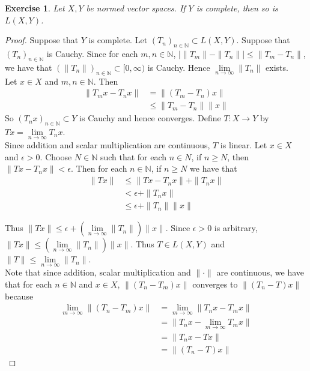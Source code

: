 \documentclass[12pt]{amsart}
\newtheorem{ex}[thm]{Exercise}
\newcommand{\ep}{\epsilon}
\newcommand{\N}{\mathbb{N}}
\newcommand{\Rg}{[0,\infty)}
\newcommand{\limn}{\lim \limits_{n \rightarrow \infty}}
\begin{document}
	\begin{ex}
		Let $X,Y$ be normed vector spaces. If $Y$ is complete, then so is $L(X,Y)$.
	\end{ex}
	
	\begin{proof}
		Suppose that $Y$ is complete. Let $(T_n)_{n \in \N} \subset L(X,Y)$. Suppose that $(T_n)_{n \in \N}$ is Cauchy. Since for each $m,n \in \N$, $\big\vert \|T_m \|- \|T_n \|\big\vert \leq \|T_m -T_n \|$, we have that $(\|T_n \|)_{n \in \N} \subset \Rg$ is Cauchy. Hence $\lim\limits_{n \rightarrow \infty}\|T_n \|$ exists. \vspace{1cm} \\ Let $x \in X$ and $m,n \in \N$. Then 
		\begin{align*}
			\|T_m x - T_n x \|
			&= \|(T_m-T_n) x \|\\
			&\leq \|T_m-T_n \|\|x \|
		\end{align*}
		So $(T_nx)_{n \in \N} \subset Y$ is Cauchy and hence converges. Define $T:X \rightarrow Y$ by $Tx = \lim\limits_{n \rightarrow \infty} T_nx$. \vspace{1cm}\\
		Since addition and scalar multiplication are continuous, $T$ is linear. Let $x \in X$ and $\ep>0$. Choose $N \in \N$ such that for each $n \in N$, if $n \geq N$, then $\|Tx - T_n x\|< \ep$. Then for each $n \in \N$, if $n \geq N$ we have that 
		\begin{align*}
			\|Tx\|
			&\leq \|Tx-T_nx \|+ \|T_nx \|\\
			&< \ep + \|T_nx \|\\
			&\leq \ep + \|T_n \|\|x \|
		\end{align*}  
		
		Thus $\|Tx \|\leq \ep +(\lim\limits_{n \rightarrow \infty} \|T_n \|) \|x \|$. Since $\ep >0$ is arbitrary, $\|Tx \|\leq (\lim\limits_{n \rightarrow \infty} \|T_n \|) \|x \|$. Thus $T \in L(X,Y)$ and $\|T \|\leq \limn \|T_n \|$. \vspace{1cm} \\
		Note that since addition, scalar multiplication and $\|\cdot \|$ are continuous, we have that for each $n \in \N$ and $x \in X$, $\|(T_n-T_m)x \|$ converges to $\|(T_n-T)x \|$ because 
		\begin{align*}
			\lim_{m \rightarrow \infty} \|(T_n-T_m)x \|
			&= \lim_{m \rightarrow \infty} \|T_nx-T_mx \|\\
			&= \|T_nx-\lim_{m \rightarrow \infty}T_mx \|\\
			&=\|T_nx-Tx \|\\
			&= \|(T_n-T)x \|
		\end{align*} 
		

\end{proof}
\end{document}
